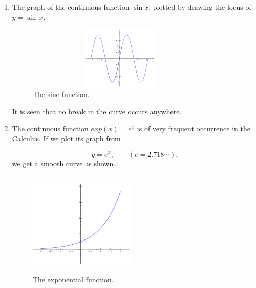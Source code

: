 \begin{enumerate}
\item
The graph of the continuous function $\sin x$, plotted by drawing the 
locus of $y = \sin\, x$,

\begin{figure}[h!]
\begin{minipage}{\textwidth}
\begin{center}
\includegraphics[height=3cm,width=9cm]{sine.eps}
\end{center}
\end{minipage}
\caption{The sine function.}
\label{fig:sin(x)}
\end{figure}

It is seen that no break in the curve occurs anywhere.

\item
The continuous function $exp(x) = e^x$ is of very frequent occurrence in 
the Calculus. If we plot its graph from

\[
    y= e^x, \qquad (e = 2.718\cdots),
\]
we get a smooth curve as shown. 

\begin{figure}[h!]
\begin{minipage}{\textwidth}
\begin{center}
\includegraphics[height=5cm,width=5cm]{exp.eps}
\end{center}
\end{minipage}
\caption{The exponential function.}
\label{fig:exp(x)}
\end{figure}


\end{enumerate}
